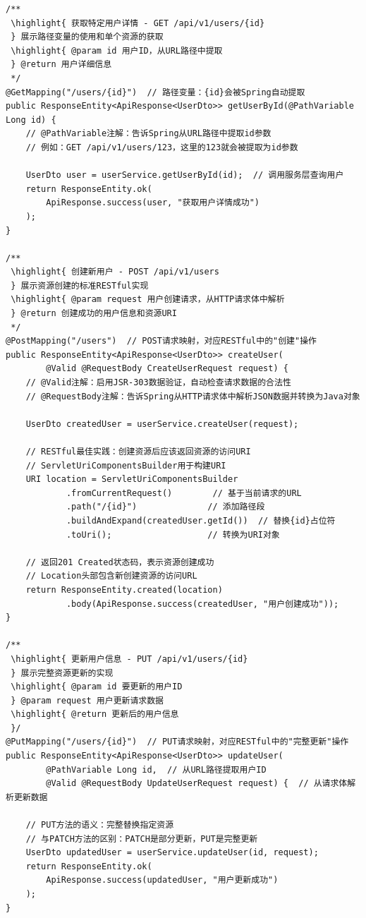 \begin{verbatim}
/**
 \highlight{ 获取特定用户详情 - GET /api/v1/users/{id}
 } 展示路径变量的使用和单个资源的获取
 \highlight{ @param id 用户ID，从URL路径中提取
 } @return 用户详细信息
 */
@GetMapping("/users/{id}")  // 路径变量：{id}会被Spring自动提取
public ResponseEntity<ApiResponse<UserDto>> getUserById(@PathVariable Long id) {
    // @PathVariable注解：告诉Spring从URL路径中提取id参数
    // 例如：GET /api/v1/users/123，这里的123就会被提取为id参数
    
    UserDto user = userService.getUserById(id);  // 调用服务层查询用户
    return ResponseEntity.ok(
        ApiResponse.success(user, "获取用户详情成功")
    );
}

/**
 \highlight{ 创建新用户 - POST /api/v1/users
 } 展示资源创建的标准RESTful实现
 \highlight{ @param request 用户创建请求，从HTTP请求体中解析
 } @return 创建成功的用户信息和资源URI
 */
@PostMapping("/users")  // POST请求映射，对应RESTful中的"创建"操作
public ResponseEntity<ApiResponse<UserDto>> createUser(
        @Valid @RequestBody CreateUserRequest request) {
    // @Valid注解：启用JSR-303数据验证，自动检查请求数据的合法性
    // @RequestBody注解：告诉Spring从HTTP请求体中解析JSON数据并转换为Java对象
    
    UserDto createdUser = userService.createUser(request);
    
    // RESTful最佳实践：创建资源后应该返回资源的访问URI
    // ServletUriComponentsBuilder用于构建URI
    URI location = ServletUriComponentsBuilder
            .fromCurrentRequest()        // 基于当前请求的URL
            .path("/{id}")              // 添加路径段
            .buildAndExpand(createdUser.getId())  // 替换{id}占位符
            .toUri();                   // 转换为URI对象
            
    // 返回201 Created状态码，表示资源创建成功
    // Location头部包含新创建资源的访问URL
    return ResponseEntity.created(location)
            .body(ApiResponse.success(createdUser, "用户创建成功"));
}

/**
 \highlight{ 更新用户信息 - PUT /api/v1/users/{id}
 } 展示完整资源更新的实现
 \highlight{ @param id 要更新的用户ID
 } @param request 用户更新请求数据
 \highlight{ @return 更新后的用户信息
 }/
@PutMapping("/users/{id}")  // PUT请求映射，对应RESTful中的"完整更新"操作
public ResponseEntity<ApiResponse<UserDto>> updateUser(
        @PathVariable Long id,  // 从URL路径提取用户ID
        @Valid @RequestBody UpdateUserRequest request) {  // 从请求体解析更新数据
    
    // PUT方法的语义：完整替换指定资源
    // 与PATCH方法的区别：PATCH是部分更新，PUT是完整更新
    UserDto updatedUser = userService.updateUser(id, request);
    return ResponseEntity.ok(
        ApiResponse.success(updatedUser, "用户更新成功")
    );
}


\end{verbatim}

